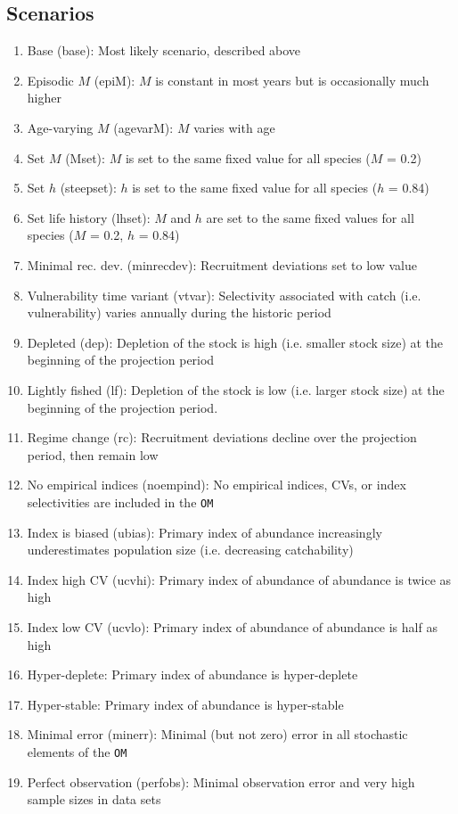 \documentclass[12pt,english]{article}
\begin{document}
\begin{flushleft}
\begin{spacing}{1.9}
\subsection*{Scenarios}


\begin{enumerate}
\item Base (base): Most likely scenario, described above

\item Episodic $M$ (epiM): $M$ is constant in most years but is occasionally much higher
\item Age-varying $M$ (agevarM): $M$ varies with age
\item Set $M$ (Mset): $M$ is set to the same fixed value for all species ($M$ = 0.2)
\item Set $h$ (steepset): $h$ is set to the same fixed value for all species ($h$ = 0.84)
\item Set life history (lhset): $M$ and $h$ are set to the same fixed values for all species ($M$ = 0.2, $h$ = 0.84)
\item Minimal rec. dev. (minrecdev): Recruitment deviations set to low value
\item Vulnerability time variant (vtvar): Selectivity associated with catch (i.e. vulnerability) varies annually during the historic period
\item Depleted (dep): Depletion of the stock is high (i.e. smaller stock size) at the beginning of the projection period
\item Lightly fished (lf): Depletion of the stock is low (i.e. larger stock size) at the beginning of the projection period.
\item Regime change (rc): Recruitment deviations decline over the projection period, then remain low

\item No empirical indices (noempind): No empirical indices, CVs, or index selectivities are included in the \texttt{OM}
\item Index is biased (ubias): Primary index of abundance increasingly underestimates population size (i.e. decreasing catchability)
\item Index high CV (ucvhi): Primary index of abundance of abundance is twice as high
\item Index low CV (ucvlo): Primary index of abundance of abundance is half as high
\item Hyper-deplete: Primary index of abundance is hyper-deplete
\item Hyper-stable: Primary index of abundance is hyper-stable
\item Minimal error (minerr): Minimal (but not zero) error in all stochastic elements of the \texttt{OM}
\item Perfect observation (perfobs): Minimal observation error and very high sample sizes in data sets


\end{enumerate}
\end{spacing}
\end{flushleft}
\end{document}
